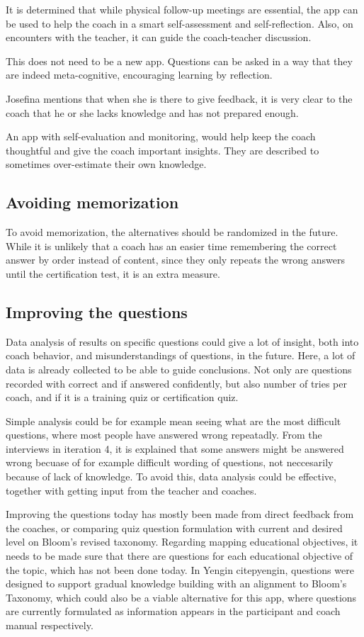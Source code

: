 It is determined that while physical follow-up meetings are essential, the app can be used to help the coach in a smart self-assessment and self-reflection. Also, on encounters with the teacher, it can guide the coach-teacher discussion.

This does not need to be a new app. Questions can be asked in a way that they are indeed meta-cognitive, encouraging learning by reflection.

Josefina mentions that when she is there to give feedback, it is very clear to the coach that he or she lacks knowledge and has not prepared enough.

An app with self-evaluation and monitoring, would help keep the coach thoughtful and give the coach important insights. They are described to sometimes over-estimate their own knowledge.

\subsection{Avoiding memorization}
To avoid memorization, the alternatives should be randomized in the future. While it is unlikely that a coach has an easier time remembering the correct answer by order instead of content, since they only repeats the wrong answers until the certification test, it is an extra measure.

\subsection{Improving the questions}
Data analysis of results on specific questions could give a lot of insight, both into coach behavior, and misunderstandings of questions, in the future. Here, a lot of data is already collected to be able to guide conclusions. Not only are questions recorded with correct and if answered confidently, but also number of tries per coach, and if it is a training quiz or certification quiz.

Simple analysis could be for example mean seeing what are the most difficult questions, where most people have answered wrong repeatadly. From the interviews in iteration 4, it is explained that some answers might be answered wrong becuase of for example difficult wording of questions, not neccesarily because of lack of knowledge. To avoid this, data analysis could be effective, together with getting input from the teacher and coaches.

Improving the questions today has mostly been made from direct feedback from the coaches, or comparing quiz question formulation with current and desired level on Bloom's revised taxonomy. Regarding mapping educational objectives, it needs to be made sure that there are questions for each educational objective of the topic, which has not been done today. In Yengin citep{yengin}, questions were designed to support gradual knowledge building with an alignment to Bloom’s Taxonomy, which could also be a viable alternative for this app, where questions are currently formulated as information appears in the participant and coach manual respectively.
